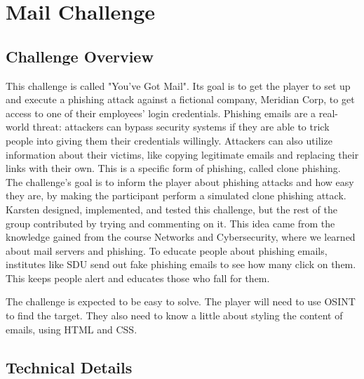 \section{Mail Challenge}\label{sec:mail-challenge}

\subsection{Challenge Overview}


This challenge is called "You've Got Mail". Its goal is to get the player to set up and execute a phishing attack against a fictional company, Meridian Corp, to get access to one of their employees' login credentials. Phishing emails are a real-world threat: attackers can bypass security systems if they are able to trick people into giving them their credentials willingly\cite[page 303]{Stallings_Brown_2017}. Attackers can also utilize information about their victims, like copying legitimate emails and replacing their links with their own. This is a specific form of phishing, called clone phishing\cite{clone_phishing}. The challenge's goal is to inform the player about phishing attacks and how easy they are, by making the participant perform a simulated clone phishing attack. Karsten designed, implemented, and tested this challenge, but the rest of the group contributed by trying and commenting on it. This idea came from the knowledge gained from the course Networks and Cybersecurity\cite{sdu_dm586}, where we learned about mail servers and phishing. To educate people about phishing emails, institutes like SDU send out fake phishing emails to see how many click on them\cite{sdu_phishing}. This keeps people alert and educates those who fall for them.

The challenge is expected to be easy to solve. The player will need to use OSINT to find the target. They also need to know a little about styling the content of emails, using HTML and CSS.

\subsection{Technical Details}


